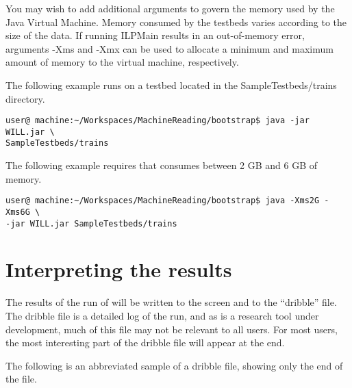 \documentclass{article}
\begin{document}
You may wish to add additional arguments to govern the memory used by the Java Virtual Machine.  Memory consumed by the testbeds varies according to the size of the data.  If running ILPMain results in an out-of-memory error,  arguments -Xms and -Xmx can be used to allocate a minimum and maximum amount of memory to the virtual machine, respectively.

The following example runs \will on a  testbed located in the SampleTestbeds/trains directory.

\begin{verbatim}
user@ machine:~/Workspaces/MachineReading/bootstrap$ java -jar WILL.jar \
SampleTestbeds/trains
\end{verbatim}

The following example requires that \will consumes between 2 GB and 6 GB of memory.

\begin{verbatim}
user@ machine:~/Workspaces/MachineReading/bootstrap$ java -Xms2G -Xms6G \
-jar WILL.jar SampleTestbeds/trains
\end{verbatim}

\section{Interpreting the results}

The results of the run of \will will be written to the screen and to the ``dribble'' file.  The dribble file is a detailed log of the run, and as \will is a research tool under development, much of this file may not be relevant to all \will users.   For most users, the most interesting part of the dribble file will appear at the end.

The following is an abbreviated sample of a dribble file, showing only the end of the file.
\end{document}
